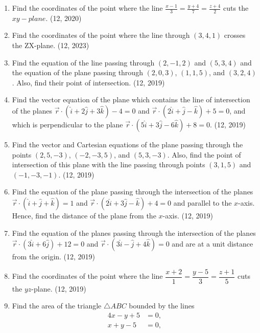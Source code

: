 \begin{enumerate}[label=\thesubsection.\arabic*, ref=\thesubsection.\theenumi]
\item Find the coordinates of the point where the line $\frac{x-1}{3} = \frac{y+4}{7} = \frac{z+4}{2}$ cuts the $xy-plane$.
\hfill (12, 2020)
    \item Find the coordinates of the point where the line through $(3, 4, 1)$ crosses the ZX-plane.
    \hfill (12, 2023)
	\item Find the equation of the line passing through $(2, -1, 2)$ and $(5, 3, 4)$ and the equation of the plane passing through $(2, 0, 3)$, $(1, 1, 5)$, and $(3, 2, 4)$. Also, find their point of intersection. \hfill (12, 2019)
	
	\item Find the vector equation of the plane which contains the line of intersection of the planes $\overrightarrow{r} \cdot (\hat{i} + 2\hat{j} + 3\hat{k}) - 4 = 0$ and $\overrightarrow{r} \cdot (2\hat{i} + \hat{j} - \hat{k}) + 5 = 0$, and which is perpendicular to the plane $\overrightarrow{r} \cdot (5\hat{i} + 3\hat{j} - 6\hat{k}) + 8 = 0$. \hfill (12, 2019)
	\item Find the vector and Cartesian equations of the plane passing through the points $(2, 5, -3)$, $(-2, -3, 5)$, and $(5, 3, -3)$. Also, find the point of intersection of this plane with the line passing through points $(3, 1, 5)$ and $(-1, -3, -1)$. \hfill (12, 2019)
	\item Find the equation of the plane passing through the intersection of the planes $\overrightarrow{r} \cdot (\hat{i} + \hat{j} + \hat{k}) = 1$ and $\overrightarrow{r} \cdot (2\hat{i} + 3\hat{j} - \hat{k}) + 4 = 0$ and parallel to the $x$-axis. Hence, find the distance of the plane from the $x$-axis. \hfill (12, 2019)
	\item Find the equation of the planes passing through the intersection of the planes $\overrightarrow{r} \cdot (3\hat{i} + 6\hat{j}) + 12 = 0$ and $\overrightarrow{r} \cdot (3\hat{i} - \hat{j} + 4\hat{k}) = 0$ and are at a unit distance from the origin. \hfill (12, 2019)
	\item Find the coordinates of the point where the line $\dfrac{x+2}{1} = \dfrac{y-5}{3} = \dfrac{z+1}{5}$ cuts the $yz$-plane. \hfill (12, 2019)
	\item Find the area of the triangle $\triangle ABC$ bounded by the lines
	\begin{align*}
	4x - y + 5 &= 0, \\
	x + y - 5 &= 0, \\

\end{align*}
\end{enumerate}
